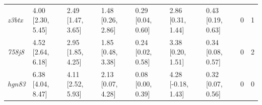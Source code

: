 \documentclass[9pt,lineno,final]{elife}
\begin{document}
\begin{table}[tb!]
\begin{center}
\begin{threeparttable}
\begin{tabular}{@{}lllllllll@{}}
\textit{z3btx} & 4.00 [2.30, 5.45] & 2.49 [1.47, 3.65] & 1.48 [0.26, 2.86] & 0.29 [0.04, 0.60] & 2.86 [0.31, 1.44] & 0.43 [0.19, 0.63] & 0 & 1 \\
\textit{758j8} & 4.52 [2.64, 6.18] & 2.95 [1.85, 4.25] & 1.85 [0.48, 3.38] & 0.24 [0.02, 0.58] & 3.38 [0.20, 1.51] & 0.34 [0.08, 0.57] & 0 & 2 \\
\textit{hgn83} & 6.38 [4.04, 8.47] & 4.11 [2.52, 5.93] & 2.13 [0.07, 4.28] & 0.08 [0.00, 0.39] & 4.28 [-0.18, 1.43] & 0.32 [0.07, 0.56] & 0 & 0 \\ \bottomrule
\end{tabular}
\end{threeparttable}
\end{center}
\end{table}
\end{document}
